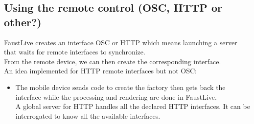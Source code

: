 \documentclass[a4paper]{article}
\begin{document}
\newpage
\subsection{ Using the remote control (OSC, HTTP or other?)} \label{remotecontrol}
FaustLive creates an interface OSC or HTTP which means launching a server that waits for remote interfaces to synchronize. \\
From the remote device, we can then create the corresponding interface.\\

An idea implemented for HTTP remote interfaces but not OSC:
\begin{itemize}
\item The mobile device sends code to create the factory then gets back the interface while the processing and rendering are done in FaustLive. \\
A global server for HTTP handles all the declared HTTP interfaces. It can be interrogated to know all the available interfaces.
\end{itemize}
\end{document}
